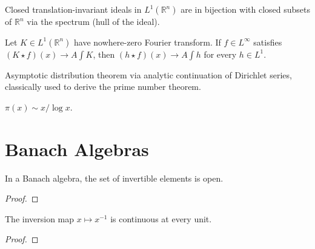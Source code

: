 \begin{theorem}
  \label{thm:closed-invariant-ideals-L1}
  \leanok
  Closed translation-invariant ideals in $L^1(\mathbb R^n)$ are in
  bijection with closed subsets of $\mathbb R^n$ via the spectrum
  (hull of the ideal).
\end{theorem}

\begin{theorem}
  \label{thm:wiener-tauberian}
  \leanok
  Let $K \in L^1(\mathbb R^n)$ have nowhere-zero Fourier transform.
  If $f \in L^\infty$ satisfies $(K \star f)(x) \to A \int K$, then
  $(h \star f)(x) \to A \int h$ for every $h \in L^1$.
\end{theorem}

\begin{theorem}
  \label{thm:ikehara}
  \leanok
  Asymptotic distribution theorem via analytic continuation of
  Dirichlet series, classically used to derive the prime number
  theorem.
\end{theorem}

\begin{theorem}
  \label{thm:pnt}
  \leanok
  $\pi(x) \sim x / \log x$.
\end{theorem}

\chapter{Banach Algebras}

\begin{theorem}
  \label{thm:units-open}
  \leanok
  In a Banach algebra, the set of invertible elements is open.
\end{theorem}
\begin{proof}
  \leanok
\end{proof}

\begin{theorem}
  \label{thm:inversion-continuous}
  \leanok
  The inversion map $x \mapsto x^{-1}$ is continuous at every unit.
\end{theorem}
\begin{proof}
  \leanok
\end{proof}

